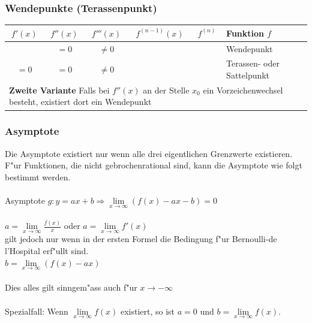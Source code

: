 \subsubsection{Wendepunkte (Terassenpunkt)}
\begin{tabular}{|c|c|c|c|c|l|}
	\hline $f'(x)$ & $f''(x)$ & $f'''(x)$ & $f^{(n-1)}(x)$ & $f^{(n)}$ & Funktion $f$ \\
	\hline\ & $= 0$ & $\neq 0$ & & & Wendepunkt\\
	\hline $= 0$ & $= 0$ & $\neq 0$ & & & Terassen- oder Sattelpunkt\\
	\hline\multicolumn{6}{|l|}{\textbf{Zweite Variante}  Falls bei $f''(x)$ an der Stelle $x_0$ ein Vorzeichenwechsel besteht, existiert dort ein Wendepunkt} \\\hline
\end{tabular}

\subsubsection{Asymptote}
	Die Asymptote existiert nur wenn alle drei eigentlichen Grenzwerte existieren.
	F"ur Funktionen, die nicht gebrochenrational sind, kann die Asymptote wie folgt bestimmt werden. \\
	\ \\ %
 	Asymptote  $g: y = ax + b \Rightarrow \lim\limits_{x \rightarrow \infty}(f(x) - ax - b) = 0$\\
	\ \\ %
	$a = \lim\limits_{x \rightarrow \infty} \frac{f(x)}{x} $ oder $a = \lim\limits_{x \rightarrow \infty} f'(x) \qquad $\\
	gilt jedoch nur wenn in der ersten Formel die Bedingung f"ur Bernoulli-de l'Hospital erf"ullt sind.\\
	$b = \lim\limits_{x \rightarrow \infty} (f(x) - ax) $\\
	\ \\ %
	Dies alles gilt sinngem"ass auch f"ur $x \rightarrow -\infty$\\
	\ \\ %
	Spezialfall: Wenn $\lim\limits_{x \rightarrow \infty} f(x)$ existiert, so ist $a = 0$ und $b = \lim\limits_{x \rightarrow \infty} f(x)$.
	
